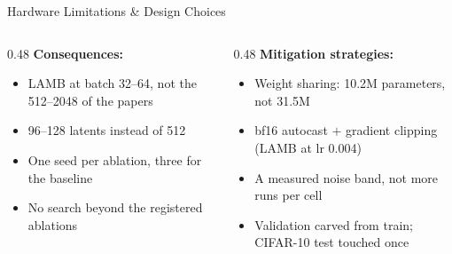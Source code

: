 \documentclass[aspectratio=169,11pt]{beamer}
\begin{document}
\begin{frame}[shrink=14]{Hardware Limitations \& Design Choices}
  \vspace{0.5em}
  \begin{columns}[T]
    \begin{column}{0.48\textwidth}
      \textbf{Consequences:}
      \begin{itemize}
        \item LAMB at batch 32--64, not the 512--2048 of the papers
        \item 96--128 latents instead of 512
        \item One seed per ablation, three for the baseline
        \item No search beyond the registered ablations
      \end{itemize}
    \end{column}
    \begin{column}{0.48\textwidth}
      \textbf{Mitigation strategies:}
      \begin{itemize}
        \item Weight sharing: 10.2M parameters, not 31.5M
        \item bf16 autocast $+$ gradient clipping (LAMB at lr 0.004)
        \item A measured noise band, not more runs per cell
        \item Validation carved from train; CIFAR-10 test touched once
      \end{itemize}
    \end{column}
  \end{columns}
\end{frame}
\end{document}
